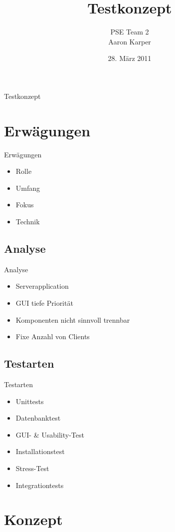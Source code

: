 \documentclass{beamer}
\title{Testkonzept}
\author{PSE Team 2 \\ Aaron Karper}
\date{28. März 2011}
\begin{document}
\maketitle
\begin{frame}{Testkonzept}
	\tableofcontents
\end{frame}
\section{Erwägungen}
\begin{frame}{Erwägungen}
	\begin{itemize}
	  \item Rolle
	  \item Umfang
	  \item Fokus
	  \item Technik
	\end{itemize}
\end{frame}
\subsection{Analyse}
\begin{frame}{Analyse}
  \begin{itemize}[<+->]
    \item Serverapplication
    \item GUI tiefe Priorität
    \item Komponenten nicht sinnvoll trennbar
    \item Fixe Anzahl von Clients
  \end{itemize}
\end{frame}
\subsection{Testarten}
\begin{frame}{Testarten}
  \begin{itemize}[<alert@+>]
    \item Unittests
    \item Datenbanktest
    \item GUI- \& Usability-Test
    \item Installationstest
    \item Stress-Test
    \item Integrationtests
  \end{itemize}
\end{frame}
\section{Konzept}
\end{document}
